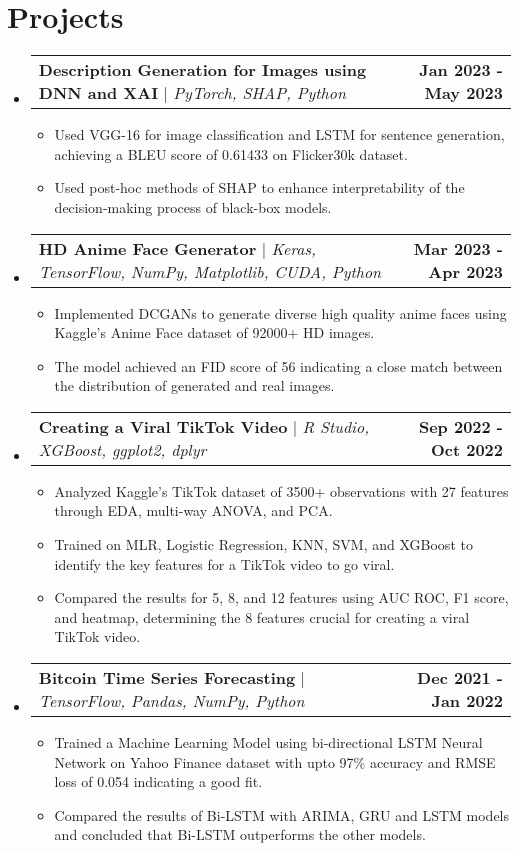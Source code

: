 \documentclass[letterpaper,10.5pt]{article}
\makeatletter
\newcommand{\resumeItem}[1]{
  \item\small{
    {#1 \vspace{-2pt}}
  }
}
\newcommand{\resumeProjectHeading}[2]{
    \item
    \begin{tabular*}{1.001\textwidth}{l@{\extracolsep{\fill}}r}
      \small#1 & \textbf{\small #2}\\
    \end{tabular*}\vspace{-7pt}
}
\newcommand{\resumeSubHeadingListStart}{\begin{itemize}[leftmargin=0.0in, label={}]}
\newcommand{\resumeSubHeadingListEnd}{\end{itemize}}
\newcommand{\resumeItemListStart}{\begin{itemize}}
\newcommand{\resumeItemListEnd}{\end{itemize}\vspace{-5pt}}
\makeatother
\begin{document}
\section{Projects}
    \vspace{-5pt}
    \resumeSubHeadingListStart
    \resumeProjectHeading
          {\textbf{Description Generation for Images using DNN and XAI} $|$ \emph{PyTorch, SHAP, Python}}{Jan 2023 - May 2023}
          \vspace{-5pt}
          \resumeItemListStart[label={\tiny$\bullet$}]
            \resumeItem{Used VGG-16 for image classification and LSTM for sentence generation, achieving a BLEU score of 0.61433 on Flicker30k dataset.}
            \resumeItem{Used post-hoc methods of SHAP to enhance interpretability of the decision-making process of black-box models.}
          \resumeItemListEnd 
          \vspace{-4pt}
      \resumeProjectHeading 
          {\textbf{HD Anime Face Generator} $|$ \emph{Keras, TensorFlow, NumPy, Matplotlib, CUDA, Python}}{Mar 2023 - Apr 2023}
          \vspace{-5pt}
          \resumeItemListStart[label={\tiny$\bullet$}]
            \resumeItem{Implemented DCGANs to generate diverse high quality anime faces using Kaggle's Anime Face dataset of 92000+ HD images.}
            \resumeItem{The model achieved an FID score of 56 indicating a close match between the distribution of generated and real images.}
          \resumeItemListEnd 
          \vspace{-4pt}
      \resumeProjectHeading 
          {\textbf{Creating a Viral TikTok Video} $|$ \emph{R Studio, XGBoost, ggplot2, dplyr}}{Sep 2022 - Oct 2022}
          \vspace{-5pt}
          \resumeItemListStart[label={\tiny$\bullet$}]
            \resumeItem{Analyzed Kaggle's TikTok dataset of 3500+ observations with 27 features through EDA, multi-way ANOVA, and PCA.}
            \resumeItem{Trained on MLR, Logistic Regression, KNN, SVM, and XGBoost to identify the key features for a TikTok video to go viral.}
            \resumeItem{Compared the results for 5, 8, and 12 features using AUC ROC, F1 score, and heatmap, determining the 8 features crucial for creating a viral TikTok video.}
          \resumeItemListEnd 
          \vspace{-4pt}
      \resumeProjectHeading
          {\textbf{Bitcoin Time Series Forecasting} $|$ \emph{TensorFlow, Pandas, NumPy, Python}}{Dec 2021 - Jan 2022}
          \vspace{-5pt}
          \resumeItemListStart[label={\tiny$\bullet$}]
            \resumeItem{Trained a Machine Learning Model using bi-directional LSTM Neural Network on Yahoo Finance dataset with upto 97\% accuracy and RMSE loss of 0.054 indicating a good fit.}
            \resumeItem{Compared the results of Bi-LSTM with ARIMA, GRU and LSTM models and concluded that Bi-LSTM outperforms the other models.}
          \resumeItemListEnd
    \resumeSubHeadingListEnd
\vspace{-8pt}
\end{document}
